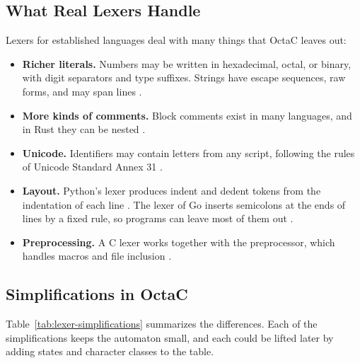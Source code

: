 \subsection{What Real Lexers Handle}

Lexers for established languages deal with many things that OctaC leaves out:

\begin{itemize}
    \item \textbf{Richer literals.} Numbers may be written in hexadecimal,
    octal, or binary, with digit separators and type suffixes. Strings have
    escape sequences, raw forms, and may span lines \cite{rust-reference}.
    \item \textbf{More kinds of comments.} Block comments exist in many
    languages, and in Rust they can be nested \cite{rust-reference}.
    \item \textbf{Unicode.} Identifiers may contain letters from any script,
    following the rules of Unicode Standard Annex 31
    \cite{unicode-uax31,python-reference}.
    \item \textbf{Layout.} Python's lexer produces indent and dedent tokens
    from the indentation of each line \cite{python-reference}. The lexer of
    Go inserts semicolons at the ends of lines by a fixed rule, so programs
    can leave most of them out \cite{go-spec}.
    \item \textbf{Preprocessing.} A C lexer works together with the
    preprocessor, which handles macros and file inclusion
    \cite{gcc-cppinternals}.
\end{itemize}

\subsection{Simplifications in OctaC}

Table~\ref{tab:lexer-simplifications} summarizes the differences. Each of the
simplifications keeps the automaton small, and each could be lifted later by
adding states and character classes to the table.

